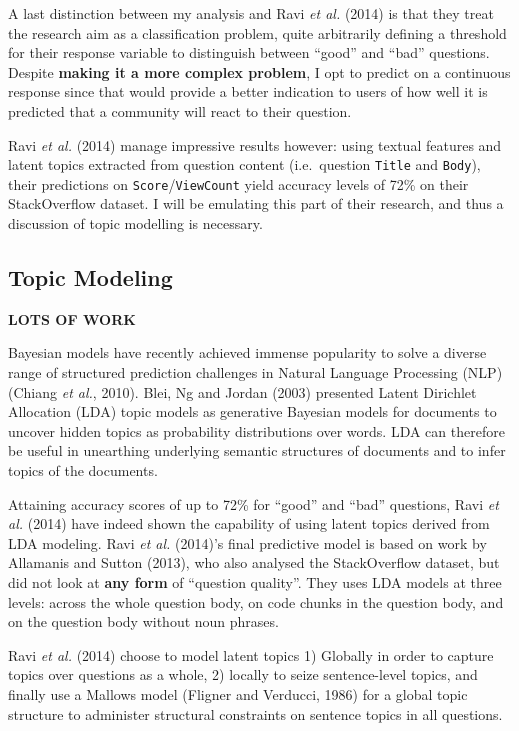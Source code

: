 \documentclass[11pt,preprint, authoryear]{article}
\numberwithin{equation}{section}
\begin{document}
A last distinction between my analysis and Ravi \emph{et al.} (2014) is
that they treat the research aim as a classification problem, quite
arbitrarily defining a threshold for their response variable to
distinguish between ``good'' and ``bad'' questions. Despite
\textbf{making it a more complex problem}, I opt to predict on a
continuous response since that would provide a better indication to
users of how well it is predicted that a community will react to their
question.

Ravi \emph{et al.} (2014) manage impressive results however: using
textual features and latent topics extracted from question content
(i.e.~question \texttt{Title} and \texttt{Body}), their predictions on
\texttt{Score}/\texttt{ViewCount} yield accuracy levels of 72\% on their
StackOverflow dataset. I will be emulating this part of their research,
and thus a discussion of topic modelling is necessary.

\subsection{\texorpdfstring{Topic Modeling
\label{model_lit}}{Topic Modeling }}\label{topic-modeling}

\textbf{LOTS OF WORK}

Bayesian models have recently achieved immense popularity to solve a
diverse range of structured prediction challenges in Natural Language
Processing (NLP) (Chiang \emph{et al.}, 2010). Blei, Ng and Jordan
(2003) presented Latent Dirichlet Allocation (LDA) topic models as
generative Bayesian models for documents to uncover hidden topics as
probability distributions over words. LDA can therefore be useful in
unearthing underlying semantic structures of documents and to infer
topics of the documents.

Attaining accuracy scores of up to 72\% for ``good'' and ``bad''
questions, Ravi \emph{et al.} (2014) have indeed shown the capability of
using latent topics derived from LDA modeling. Ravi \emph{et al.}
(2014)'s final predictive model is based on work by Allamanis and Sutton
(2013), who also analysed the StackOverflow dataset, but did not look at
\textbf{any form} of ``question quality''. They uses LDA models at three
levels: across the whole question body, on code chunks in the question
body, and on the question body without noun phrases.

Ravi \emph{et al.} (2014) choose to model latent topics 1) Globally in
order to capture topics over questions as a whole, 2) locally to seize
sentence-level topics, and finally use a Mallows model (Fligner and
Verducci, 1986) for a global topic structure to administer structural
constraints on sentence topics in all questions.
\end{document}
